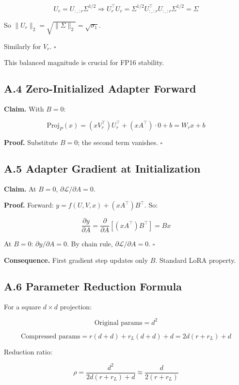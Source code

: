 \[
U_r = U_{:, :r} \Sigma^{1/2} \Rightarrow U_r^\top U_r = \Sigma^{1/2} U_{:, :r}^\top U_{:, :r} \Sigma^{1/2} = \Sigma
\tag{A.4}
\]

So $\|U_r\|_2 = \sqrt{\|\Sigma\|_2} = \sqrt{\sigma_1}$.

Similarly for $V_r$. $\square$

This balanced magnitude is crucial for FP16 stability.

\subsection{A.4 Zero-Initialized Adapter Forward}

\textbf{Claim.} With $B = 0$:

\[
\text{Proj}_P(x) = (x V_r^\top) U_r^\top + (x A^\top) \cdot 0 + b = W_r x + b
\tag{A.5}
\]

\textbf{Proof.} Substitute $B = 0$; the second term vanishes. $\square$

\subsection{A.5 Adapter Gradient at Initialization}

\textbf{Claim.} At $B = 0$, $\partial \mathcal{L} / \partial A = 0$.

\textbf{Proof.} Forward: $y = f(U, V, x) + (x A^\top) B^\top$. So:

\[
\frac{\partial y}{\partial A} = \frac{\partial}{\partial A} \left[ (x A^\top) B^\top \right] = B x
\tag{A.6}
\]

At $B = 0$: $\partial y / \partial A = 0$. By chain rule, $\partial \mathcal{L} / \partial A = 0$. $\square$

\textbf{Consequence.} First gradient step updates only $B$. Standard LoRA property.

\subsection{A.6 Parameter Reduction Formula}

For a square $d \times d$ projection:

\[
\text{Original params} = d^2
\tag{A.7}
\]

\[
\text{Compressed params} = r(d + d) + r_L(d + d) + d = 2d(r + r_L) + d
\tag{A.7}
\]

Reduction ratio:

\[
\rho = \frac{d^2}{2d(r + r_L) + d} \approx \frac{d}{2(r + r_L)}
\tag{A.8}
\]

